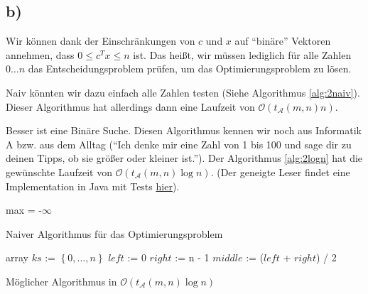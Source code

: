 \documentclass{article}
\begin{document}
\subsection*{b)}
Wir können dank der Einschränkungen von $c$ und $x$ auf "`binäre"' Vektoren annehmen, dass $0 \leq c^Tx \leq n$ ist.
Das heißt, wir müssen lediglich für alle Zahlen $0\dots n$ das Entscheidungsproblem prüfen, um das Optimierungsproblem zu lösen. 

Naiv könnten wir dazu einfach alle Zahlen testen (Siehe Algorithmus \ref{alg:2naiv}). Dieser Algorithmus hat allerdings dann eine Laufzeit von $\mathcal{O}\left(t_\mathcal{A}\left(m,n\right)n\right)$.

Besser ist eine Binäre Suche. Diesen Algorithmus kennen wir noch aus Informatik A bzw. aus dem Alltag ("`Ich denke mir eine Zahl von 1 bis 100 und sage dir zu deinen Tipps, ob sie größer oder kleiner ist."'). Der Algorithmus \ref{alg:2logn} hat die gewünschte Laufzeit von $\mathcal{O}\left(t_\mathcal{A}\left(m,n\right)\log{n}\right)$. (Der geneigte Leser findet eine Implementation in Java mit Tests \href{http://uni.sebastian-hoeffner.de/DInf/DInf14102b.java}{hier}).

\begin{algorithm}
\DontPrintSemicolon
max = -$\infty$\;
\;
\label{alg:2naiv}
\caption{Naiver Algorithmus für das Optimierungsproblem}
\end{algorithm}

\begin{algorithm}
  \DontPrintSemicolon
  array $ks$ := $\left\{0, \dots, n\right\}$\;
  $left$     := 0\;
  $right$    := n - 1\;
  $middle$   := ($left$ + $right$) / 2\;
  \label{alg:2logn}
  \caption{Möglicher Algorithmus in $\mathcal{O}\left(t_\mathcal{A}\left(m,n\right)\log{n}\right)$}
\end{algorithm}
\end{document}

